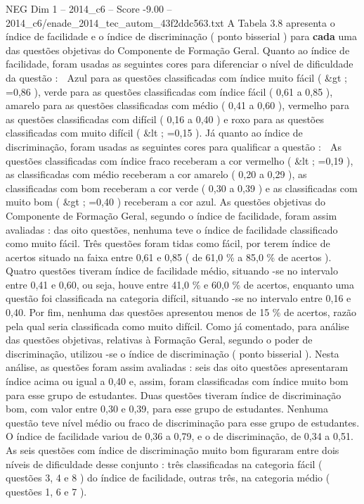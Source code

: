 \begin{textsample}{NEG Dim 1 – 2014\_c6 – Score -9.00 – 2014\_c6/enade\_2014\_tec\_autom\_43f2ddc563.txt}
A Tabela 3.8 apresenta o índice de facilidade e o índice de discriminação ( ponto bisserial ) para \textbf{cada} uma das questões objetivas do Componente de Formação Geral.
Quanto ao índice de facilidade, foram usadas as seguintes cores para diferenciar o nível de dificuldade da questão :  Azul para as questões classificadas com índice muito fácil ( \&gt ; =0,86 ), verde para as questões classificadas com índice fácil ( 0,61 a 0,85 ), amarelo para as questões classificadas com médio ( 0,41 a 0,60 ), vermelho para as questões classificadas com difícil ( 0,16 a 0,40 ) e roxo para as questões classificadas com muito difícil ( \&lt ; =0,15 ).
Já quanto ao índice de discriminação, foram usadas as seguintes cores para qualificar a questão :  As questões classificadas com índice fraco receberam a cor vermelho ( \&lt ; =0,19 ), as classificadas com médio receberam a cor amarelo ( 0,20 a 0,29 ), as classificadas com bom receberam a cor verde ( 0,30 a 0,39 ) e as classificadas com muito bom ( \&gt ; =0,40 ) receberam a cor azul.
As questões objetivas do Componente de Formação Geral, segundo o índice de facilidade, foram assim avaliadas : das oito questões, nenhuma teve o índice de facilidade classificado como muito fácil.
Três questões foram tidas como fácil, por terem índice de acertos situado na faixa entre 0,61 e 0,85 ( de 61,0 \% a 85,0 \% de acertos ).
Quatro questões tiveram índice de facilidade médio, situando -se no intervalo entre 0,41 e 0,60, ou seja, houve entre 41,0 \% e 60,0 \% de acertos, enquanto uma questão foi classificada na categoria difícil, situando -se no intervalo entre 0,16 e 0,40.
Por fim, nenhuma das questões apresentou menos de 15 \% de acertos, razão pela qual seria classificada como muito difícil.
Como já comentado, para análise das questões objetivas, relativas à Formação Geral, segundo o poder de discriminação, utilizou -se o índice de discriminação ( ponto bisserial ).
Nesta análise, as questões foram assim avaliadas : seis das oito questões apresentaram índice acima ou igual a 0,40 e, assim, foram classificadas com índice muito bom para esse grupo de estudantes.
Duas questões tiveram índice de discriminação bom, com valor entre 0,30 e 0,39, para esse grupo de estudantes.
Nenhuma questão teve nível médio ou fraco de discriminação para esse grupo de estudantes.
O índice de facilidade variou de 0,36 a 0,79, e o de discriminação, de 0,34 a 0,51.
As seis questões com índice de discriminação muito bom figuraram entre dois níveis de dificuldade desse conjunto : três classificadas na categoria fácil ( questões 3, 4 e 8 ) do índice de facilidade, outras três, na categoria médio ( questões 1, 6 e 7 ).

\end{textsample}

